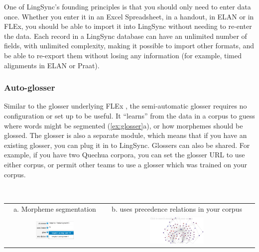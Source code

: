 \documentclass[letterpaper, 12pt, dvips]{mitwpl}
\begin{document}
One of LingSync's founding principles is that you should only need to enter data once.
Whether you enter it in an Excel Spreadsheet,
in a handout,
in ELAN or in FLEx,
you should be able to import it into LingSync without needing to re-enter the data.
 Each record in a LingSync database can have an unlimited number of fields,
with unlimited complexity,
making it possible to import other formats,
and be able to re-export them without losing any information (for example,
timed alignments in ELAN or Praat).



\subsubsection{Auto-glosser}
\label{sec:autoglosser}
 

Similar to the glosser underlying FLEx \citep{Black:2006}, the semi-automatic glosser requires no configuration or set up to be useful.
It ``learns'' from the data in a corpus to guess where words might be segmented (\ref{ex:glosser}a),
or how morphemes should be glossed.
The glosser is also a separate module,
which means that if you have an existing glosser, you can plug it in to LingSync.
Glossers can also be shared.
For example,
if you have two Quechua corpora,
you can set the glosser URL to use either corpus, or permit other teams to use a glosser which was trained on your corpus.
 


\begin{exe} 
\ex \label{ex:glosser}  ~  \\ 
 \begin{tabular}{c c c} 
 a. Morpheme segmentation  & b. uses precedence relations in your corpus\\
  \includegraphics[width=0.4\textwidth]{glosser} &
   \includegraphics[width=0.4\textwidth]{morphemePrecedenceRelations}
\end{tabular}
\end{exe}
\end{document}
